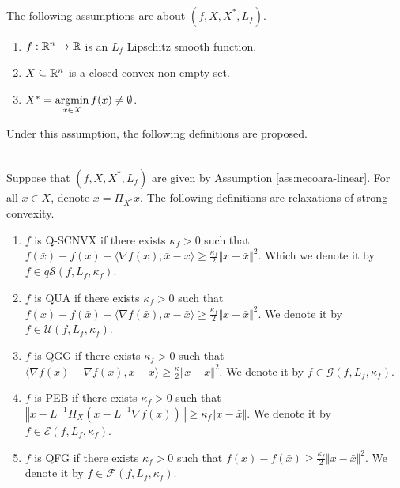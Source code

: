 \documentclass[12pt]{article}
\begin{document}
    \begin{assumption}\; \label{ass:necoara-linear} \\
        The following assumptions are about $(f, X, X^*, L_f)$. 
        \begin{enumerate}[nosep]
            \item $f: \mathbb R^n \rightarrow \mathbb R$ is an $L_f$ Lipschitz smooth function. 
            \item $X \subseteq \mathbb R^n$ is a closed convex non-empty set. 
            \item $X^* = \mathop{\rm argmin}\limits_{x \in X} f(x) \neq \emptyset$. 
        \end{enumerate}
    \end{assumption}
    Under this assumption, the following definitions are proposed. 
    \newcommand{\QSCNVX}{\ensuremath{q\mathcal{S}}}
    \newcommand{\QUA}{\ensuremath{\mathcal U}}
    \newcommand{\QGG}{\ensuremath{\mathcal G}}
    \newcommand{\QFG}{\ensuremath{\mathcal F}} 
    \newcommand{\PEB}{\ensuremath{\mathcal E}}
    \begin{definition}\; \\
        Suppose that $(f, X, X^*, L_f)$ are given by Assumption \ref{ass:necoara-linear}. 
        For all $x \in X$, denote $\bar x = \Pi_{X^*}x$. 
        The following definitions are relaxations of strong convexity. 
        \begin{enumerate}[nosep]
            \item $f$ is Q-SCNVX if there exists $\kappa_f > 0$ such that $f(\bar x) - f(x) - \langle \nabla f(x), \bar x - x\rangle \ge \frac{\kappa_f}{2}\Vert x - \bar x\Vert^2$. 
            Which we denote it by $f \in \QSCNVX(f, L_f, \kappa_f)$. 
            \item $f$ is QUA if there exists $\kappa_f > 0$ such that $f(x) - f(\bar x) - \langle \nabla f(\bar x), x - \bar x\rangle \ge \frac{\kappa_f}{2}\Vert x -\bar x\Vert^2$. 
            We denote it by $f \in \QUA(f, L_f, \kappa_f)$.
            \item $f$ is QGG if there exists $\kappa_f > 0$ such that $\langle \nabla f(x) - \nabla f(\bar x), x - \bar x\rangle \ge \frac{\kappa}{2}\Vert x - \bar x\Vert^2$. 
            We denote it by $f \in \QGG(f, L_f, \kappa_f)$. 
            \item $f$ is PEB if there exists $\kappa_f > 0$ such that $\left\Vert x - L^{-1}\Pi_X(x - L^{-1}\nabla f(x))\right\Vert \ge \kappa_f\Vert x - \bar x\Vert$. 
            We denote it by $f \in \PEB(f, L_f, \kappa_f)$. 
            \item $f$ is QFG if there exists $\kappa_f > 0$ such that $f(x) - f(\bar x) \ge \frac{\kappa_f}{2}\Vert x - \bar x\Vert^2$. 
            We denote it by $f \in \QFG(f, L_f, \kappa_f)$. 
        \end{enumerate}
    \end{definition}
\end{document}
